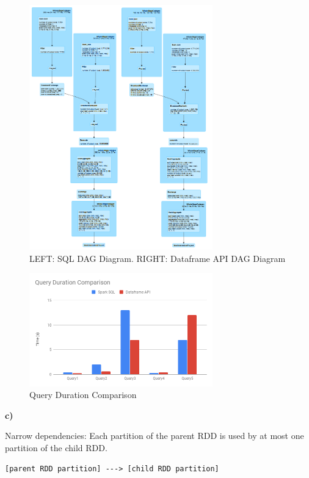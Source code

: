 \documentclass[]{article}
\begin{document}
\begin{figure}[h]

{\centering \includegraphics[width=300px]{images/query5} 

}

\caption{\label{fig:figs}LEFT: SQL DAG Diagram. RIGHT: Dataframe API DAG Diagram}\label{fig:unnamed-chunk-11}
\end{figure}

\begin{figure}[h]

{\centering \includegraphics[width=300px]{images/Query Duration Comparison} 

}

\caption{\label{fig:figs}Query Duration Comparison}\label{fig:unnamed-chunk-12}
\end{figure}

\textbf{c)}

Narrow dependencies: Each partition of the parent RDD is used by at most
one partition of the child RDD.

\begin{verbatim}
[parent RDD partition] ---> [child RDD partition]
\end{verbatim}
\end{document}
